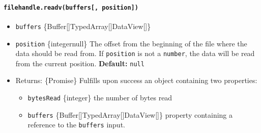 \begin{Shaded}
\begin{Highlighting}[]
\OperatorTok{=} \NormalTok{(}\NormalTok{)}\OperatorTok{;}

\NormalTok{(}\NormalTok{ () }\KeywordTok{=\textgreater{}}\NormalTok{ \{}
  \OperatorTok{=}  \NormalTok{(}\NormalTok{)}\OperatorTok{;}

   \NormalTok{ (}\NormalTok{()) \{}
    \OperatorTok{;}
\NormalTok{  \}}
\NormalTok{\})()}\OperatorTok{;}
\end{Highlighting}
\end{Shaded}

\paragraph{\texorpdfstring{\texttt{filehandle.readv(buffers{[},\ position{]})}}{filehandle.readv(buffers{[}, position{]})}}\label{filehandle.readvbuffers-position}

\begin{itemize}
\tightlist
\item
  \texttt{buffers}
  \{Buffer{[}{]}\textbar TypedArray{[}{]}\textbar DataView{[}{]}\}
\item
  \texttt{position} \{integer\textbar null\} The offset from the
  beginning of the file where the data should be read from. If
  \texttt{position} is not a \texttt{number}, the data will be read from
  the current position. \textbf{Default:} \texttt{null}
\item
  Returns: \{Promise\} Fulfills upon success an object containing two
  properties:

  \begin{itemize}
  \tightlist
  \item
    \texttt{bytesRead} \{integer\} the number of bytes read
  \item
    \texttt{buffers}
    \{Buffer{[}{]}\textbar TypedArray{[}{]}\textbar DataView{[}{]}\}
    property containing a reference to the \texttt{buffers} input.
  \end{itemize}
\end{itemize}

